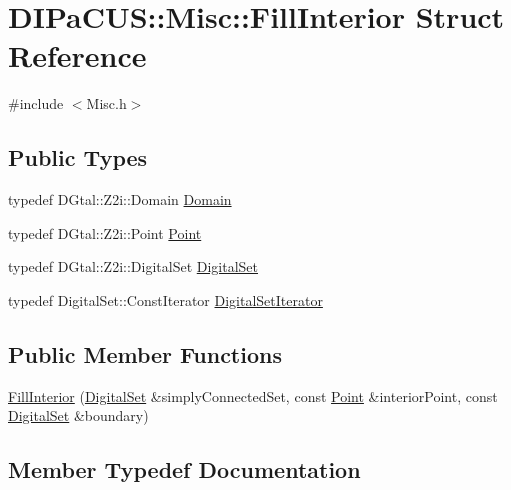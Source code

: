 \hypertarget{structDIPaCUS_1_1Misc_1_1FillInterior}{}\section{D\+I\+Pa\+C\+US\+:\+:Misc\+:\+:Fill\+Interior Struct Reference}
\label{structDIPaCUS_1_1Misc_1_1FillInterior}


{\ttfamily \#include $<$Misc.\+h$>$}

\subsection*{Public Types}
\begin{DoxyCompactItemize}
\item 
typedef D\+Gtal\+::\+Z2i\+::\+Domain \mbox{\hyperlink{structDIPaCUS_1_1Misc_1_1FillInterior_aede1ff20c08c25e284b03e8cafc7088b}{Domain}}
\item 
typedef D\+Gtal\+::\+Z2i\+::\+Point \mbox{\hyperlink{structDIPaCUS_1_1Misc_1_1FillInterior_a88bed595883eb022eb4e9f093ee00d18}{Point}}
\item 
typedef D\+Gtal\+::\+Z2i\+::\+Digital\+Set \mbox{\hyperlink{structDIPaCUS_1_1Misc_1_1FillInterior_a6fb325418d6c5f5e07619176576708aa}{Digital\+Set}}
\item 
typedef Digital\+Set\+::\+Const\+Iterator \mbox{\hyperlink{structDIPaCUS_1_1Misc_1_1FillInterior_ae4f166d1f35d29c577f5b653a4b9ceac}{Digital\+Set\+Iterator}}
\end{DoxyCompactItemize}
\subsection*{Public Member Functions}
\begin{DoxyCompactItemize}
\item 
\mbox{\hyperlink{structDIPaCUS_1_1Misc_1_1FillInterior_a05ba475a43a025a4d06577b3ad20e298}{Fill\+Interior}} (\mbox{\hyperlink{structDIPaCUS_1_1Misc_1_1FillInterior_a6fb325418d6c5f5e07619176576708aa}{Digital\+Set}} \&simply\+Connected\+Set, const \mbox{\hyperlink{structDIPaCUS_1_1Misc_1_1FillInterior_a88bed595883eb022eb4e9f093ee00d18}{Point}} \&interior\+Point, const \mbox{\hyperlink{structDIPaCUS_1_1Misc_1_1FillInterior_a6fb325418d6c5f5e07619176576708aa}{Digital\+Set}} \&boundary)
\end{DoxyCompactItemize}


\subsection{Member Typedef Documentation}
\mbox{\label{structDIPaCUS_1_1Misc_1_1FillInterior_a6fb325418d6c5f5e07619176576708aa}} 
